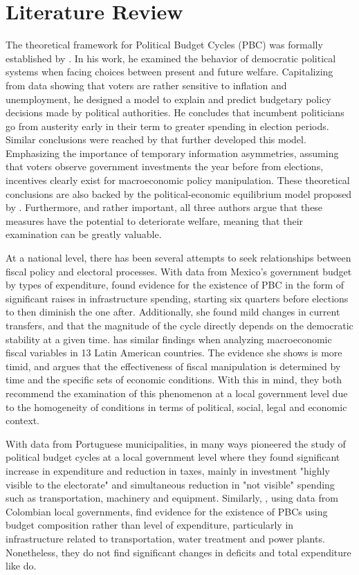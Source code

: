 \section{Literature Review}
The theoretical framework for Political Budget Cycles (PBC) was formally established by \textcite{nordhaus1975}. In his work, he examined the behavior of democratic political systems when facing choices between present and future welfare. Capitalizing from data showing that voters are rather sensitive to inflation and unemployment, he designed a model to explain and predict budgetary policy decisions made by political authorities. He concludes that incumbent politicians go from austerity early in their term to greater spending in election periods. Similar conclusions were reached by \textcite{rogoff1988} that further developed this model. Emphasizing the importance of temporary information asymmetries, assuming that voters observe government investments the year before from elections, incentives clearly exist for macroeconomic policy manipulation. These theoretical conclusions are also backed by the political-economic equilibrium model proposed by \textcite{drazen2010}. Furthermore, and rather important, all three authors argue that these measures have the potential to deteriorate welfare, meaning that their examination can be greatly valuable.

At a national level, there has been several attempts to seek relationships between fiscal policy and electoral processes. With data from Mexico's government budget by types of expenditure, \textcite{gonzalez2002} found evidence for the existence of PBC in the form of significant raises in infrastructure spending, starting six quarters before elections to then diminish the one after. Additionally, she found mild changes in current transfers, and that the magnitude of the cycle directly depends on the democratic stability at a given time. \textcite{lankaster2017} has similar findings when analyzing macroeconomic fiscal variables in 13 Latin American countries. The evidence she shows is more timid, and argues that the effectiveness of fiscal manipulation is determined by time and the specific sets of economic conditions. With this in mind, they both recommend the examination of this phenomenon at a local government level due to the homogeneity of conditions in terms of political, social, legal and economic context.

With data from Portuguese municipalities, \textcite{veiga2007} in many ways pioneered the study of political budget cycles at a local government level where they found significant increase in expenditure and reduction in taxes, mainly in investment "highly visible to the electorate" and simultaneous reduction in "not visible" spending such as transportation, machinery and equipment. Similarly, \textcite{drazen2010}, using data from Colombian local governments, find evidence for the existence of PBCs using budget composition rather than level of expenditure, particularly in infrastructure related to transportation, water treatment and power plants. Nonetheless, they do not find significant changes in deficits and total expenditure like \textcite{veiga2007} do.

